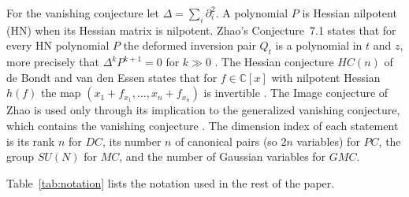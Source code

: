 \documentclass[11pt]{article}
\theoremstyle{remark}
\newcommand{\C}{\mathbb{C}}
\begin{document}
For the vanishing conjecture let $\Delta=\sum_i\partial_i^2$. A polynomial $P$ is Hessian nilpotent (HN) when its Hessian matrix is nilpotent. Zhao's Conjecture~7.1 states that for every HN polynomial $P$ the deformed inversion pair $Q_t$ is a polynomial in $t$ and $z$, more precisely that $\Delta^kP^{k+1}=0$ for $k\gg0$ \cite[Conjecture~7.1, p.~30]{Zhao2004}. The Hessian conjecture $HC(n)$ of de Bondt and van den Essen states that for $f\in\C[x]$ with nilpotent Hessian $h(f)$ the map $(x_1+f_{x_1},\dots,x_n+f_{x_n})$ is invertible \cite[p.~2202]{dBvdE2005}. The Image conjecture of Zhao \cite{Zhao2010} is used only through its implication to the generalized vanishing conjecture, which contains the vanishing conjecture \cite[abstract, p.~1]{vdE2010}. The dimension index of each statement is its rank $n$ for $DC$, its number $n$ of canonical pairs (so $2n$ variables) for $PC$, the group $SU(N)$ for $MC$, and the number of Gaussian variables for $GMC$.

Table~\ref{tab:notation} lists the notation used in the rest of the paper.
\end{document}

